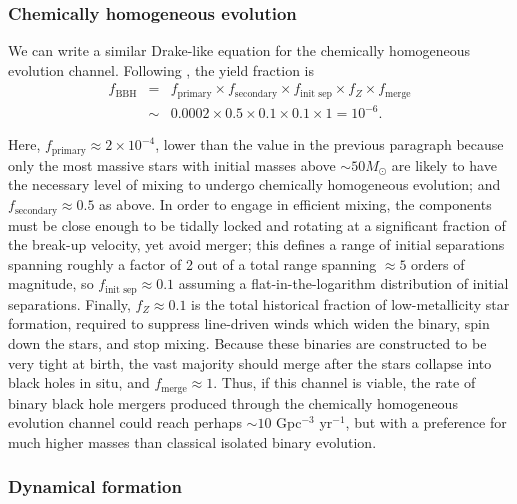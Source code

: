 \documentclass[review]{elsarticle}
\begin{document}
\subsubsection{Chemically homogeneous evolution}

We can write a similar Drake-like equation for the chemically homogeneous evolution channel.  Following \citet{MandeldeMink:2016},  the yield fraction is
\begin{eqnarray}
f_\textrm{BBH} &=& f_\textrm{primary} \times f_\textrm{secondary} \times f_\textrm{init sep} \times f_Z \times f_\textrm{merge} \nonumber \\
 & \sim & 0.0002 \times 0.5 \times 0.1 \times 0.1 \times 1 = 10^{-6}.
\end{eqnarray}

Here, $f_\textrm{primary} \approx 2 \times 10^{-4}$, lower than the value in the previous paragraph because only the most massive stars with initial masses above $\sim 50 M_\odot$ are likely to have the necessary level of mixing to undergo chemically homogeneous evolution; and $f_\textrm{secondary} \approx 0.5$ as above.  In order to engage in efficient mixing, the components must be close enough to be tidally locked and rotating at a significant fraction of the break-up velocity, yet avoid merger; this defines a range of initial separations spanning roughly a factor of 2 out of a total range spanning $\approx 5$ orders of magnitude, so $f_\textrm{init sep} \approx 0.1$ assuming a flat-in-the-logarithm distribution of initial separations.  Finally, $f_Z \approx 0.1$ is the total historical fraction of low-metallicity star formation, required to suppress line-driven winds which widen the binary, spin down the stars, and stop mixing.  Because these binaries are constructed to be very tight at birth, the vast majority should merge after the stars collapse into black holes in situ, and $f_\textrm{merge} \approx 1$. Thus, if this channel is viable, the rate of binary black hole mergers produced through the chemically homogeneous evolution channel could reach perhaps $\sim 10$ Gpc$^{-3}$ yr$^{-1}$, but with a preference for much higher masses than classical isolated binary evolution.


\subsubsection{Dynamical formation}
\end{document}
